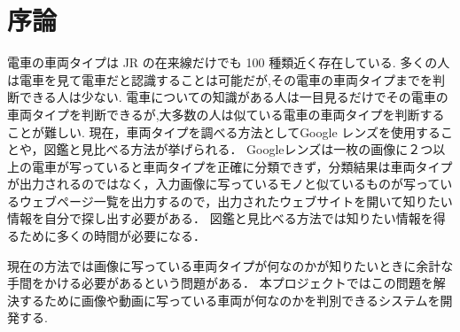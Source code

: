 

\chapter{序論}\label{joron}

電車の車両タイプは JR の在来線だけでも 100 種類近く存在している.
多くの人は電車を見て電車だと認識することは可能だが,その電車の車両タイプまでを判断できる人は少ない.
電車についての知識がある人は一目見るだけでその電車の車両タイプを判断できるが,大多数の人は似ている電車の車両タイプを判断することが難しい.
現在，車両タイプを調べる方法としてGoogle レンズを使用することや，図鑑と見比べる方法が挙げられる．
Googleレンズは一枚の画像に２つ以上の電車が写っていると車両タイプを正確に分類できず，分類結果は車両タイプが出力されるのではなく，入力画像に写っているモノと似ているものが写っているウェブページ一覧を出力するので，出力されたウェブサイトを開いて知りたい情報を自分で探し出す必要がある．
図鑑と見比べる方法では知りたい情報を得るために多くの時間が必要になる．

現在の方法では画像に写っている車両タイプが何なのかが知りたいときに余計な手間をかける必要があるという問題がある．
本プロジェクトではこの問題を解決するために画像や動画に写っている車両が何なのかを判別できるシステムを開発する.



